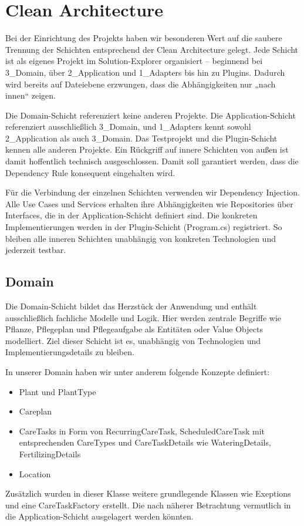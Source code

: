 \chapter{Clean Architecture}
Bei der Einrichtung des Projekts haben wir besonderen Wert auf die saubere Trennung der Schichten entsprechend der Clean Architecture gelegt.
Jede Schicht ist als eigenes Projekt im Solution-Explorer organisiert – beginnend bei 3\_Domain, über 2\_Application und 1\_Adapters bis hin zu Plugins.
Dadurch wird bereits auf Dateiebene erzwungen, dass die Abhängigkeiten nur „nach innen“ zeigen.

Die Domain-Schicht referenziert keine anderen Projekte. Die Application-Schicht referenziert ausschließlich 3\_Domain, und 1\_Adapters kennt
sowohl 2\_Application als auch 3\_Domain. Das Testprojekt und die Plugin-Schicht kennen alle anderen Projekte. Ein Rückgriff auf innere Schichten
von außen ist damit hoffentlich technisch ausgeschlossen. Damit soll garantiert werden, dass die Dependency Rule konsequent eingehalten wird.

Für die Verbindung der einzelnen Schichten verwenden wir Dependency Injection. Alle Use Cases und Services erhalten ihre Abhängigkeiten wie Repositories
über Interfaces, die in der Application-Schicht definiert sind. Die konkreten Implementierungen werden in der Plugin-Schicht (Program.cs)
registriert. So bleiben alle inneren Schichten unabhängig von konkreten Technologien und jederzeit testbar.
\section{Domain}
Die Domain-Schicht bildet das Herzstück der Anwendung und enthält ausschließlich fachliche Modelle und Logik. Hier werden zentrale Begriffe wie
Pflanze, Pflegeplan und Pflegeaufgabe als Entitäten oder Value Objects modelliert. Ziel dieser Schicht ist es, unabhängig von Technologien und
Implementierungsdetails zu bleiben.

In unserer Domain haben wir unter anderem folgende Konzepte definiert:
\begin{itemize}
    \item Plant und PlantType
    \item Careplan
    \item CareTasks in Form von RecurringCareTask, ScheduledCareTask mit entsprechenden CareTypes und CareTaskDetails wie WateringDetails, FertilizingDetails
    \item Location
\end{itemize}
Zusätzlich wurden in dieser Klasse weitere grundlegende Klassen wie Exeptions und eine CareTaskFactory erstellt. Die nach näherer Betrachtung
vermutlich in die Application-Schicht ausgelagert werden könnten.

